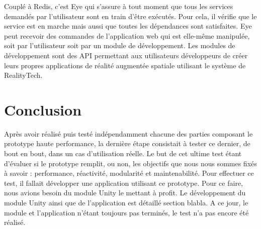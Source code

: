 Couplé à Redis, c'est Eye qui s'assure à tout moment que tous les services demandés par l'utilisateur sont en train d'être exécutés. Pour cela, il vérifie que le service est en marche mais aussi que toutes les dépendances sont satisfaites. Eye peut recevoir des commandes de l'application web qui est elle-même manipulée, soit par l'utilisateur soit par un module de développement. Les modules de développement sont des API permettant aux utilisateurs développeurs de créer leurs propres applications de réalité augmentée spatiale utilisant le système de RealityTech.

\section{Conclusion}
Après avoir réalisé puis testé indépendamment chacune des parties composant le prototype haute performance, la dernière étape consistait à tester ce dernier, de bout en bout, dans un cas d'utilisation réelle. Le but de cet ultime test étant d'évaluer si le prototype remplit, ou non, les objectifs que nous nous sommes fixés à savoir : performance, réactivité, modularité et maintenabilité. 
Pour effectuer ce test, il fallait développer une application utilisant ce prototype. Pour ce faire, nous avions besoin du module Unity le mettant à profit. Le développement du module Unity ainsi que de l'application est détaillé section blabla.
A ce jour, le module et l'application n'étant toujours pas terminés, le test n'a pas encore été réalisé.